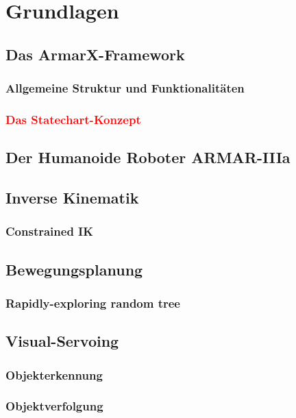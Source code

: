 \chapter{Grundlagen}

\section{Das ArmarX-Framework}
\subsection{Allgemeine Struktur und Funktionalitäten}
\subsection{\textcolor{red}{Das Statechart-Konzept}}

\section{Der Humanoide Roboter ARMAR-IIIa}

\section{Inverse Kinematik}\label{sec:InverseKinematik}
\subsection{Constrained IK}\label{sec:ConstrainedIK}

\section{Bewegungsplanung} \label{sec:Bewegungsplanung}
\subsection{Rapidly-exploring random tree}

\section{Visual-Servoing}
\subsection{Objekterkennung}
\subsection{Objektverfolgung}